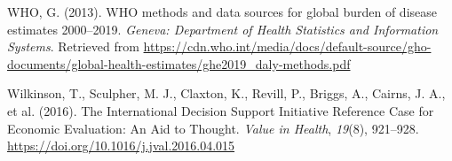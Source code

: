 \documentclass[
]{agujournal2019}
\newlength{\cslhangindent}
\newenvironment{CSLReferences}[2] %
 {\begin{list}{}{%
  \setlength{\itemindent}{0pt}
  \setlength{\leftmargin}{0pt}
  \setlength{\parsep}{0pt}
  \ifodd #1
   \setlength{\leftmargin}{\cslhangindent}
   \setlength{\itemindent}{-1\cslhangindent}
  \fi
  \setlength{\itemsep}{#2\baselineskip}}}
 {\end{list}}
\begin{document}
\begin{CSLReferences}{1}{0}
WHO, G. (2013). WHO methods and data sources for global burden of
disease estimates 2000--2019. \emph{Geneva: Department of Health
Statistics and Information Systems}. Retrieved from
\url{https://cdn.who.int/media/docs/default-source/gho-documents/global-health-estimates/ghe2019_daly-methods.pdf}

Wilkinson, T., Sculpher, M. J., Claxton, K., Revill, P., Briggs, A.,
Cairns, J. A., et al. (2016). The International Decision Support
Initiative Reference Case for Economic Evaluation: An Aid to Thought.
\emph{Value in Health}, \emph{19}(8), 921--928.
\url{https://doi.org/10.1016/j.jval.2016.04.015}

\end{CSLReferences}
\end{document}
